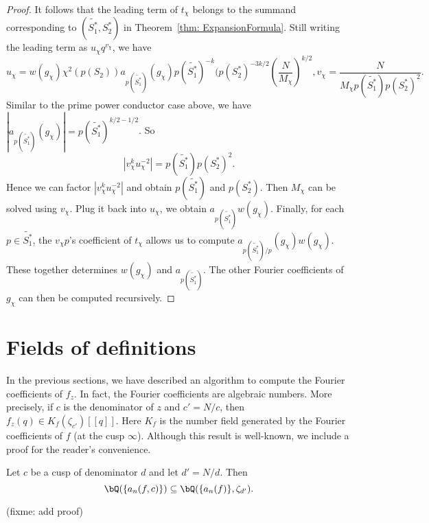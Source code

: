 \documentclass [11pt, proquest] {uwthesis}[2015/03/03]
\begin{document}
\begin{proof}
It follows that the leading term of $t_\chi$ belongs to the summand corresponding to $(\widetilde{S_1^*}, S_2^*)$ in  Theorem~\ref{thm: ExpansionFormula}. Still writing the leading term as $u_\chi q^{v_\chi}$, we have 
\[
	u_\chi = w(g_\chi) \chi^2(p(S_2)) a_{p(\widetilde{S_1^*})}(g_\chi) p(\widetilde{S_1^*})^{-k} (p(S_2^*)^{-3k/2} \left(\frac{N}{M_\chi}\right)^{k/2}, v_\chi = \frac{N}{M_\chi p(\widetilde{S_1^*}) p(S_2^*)^2}. 
\]
Similar to the prime power conductor case above, we have $|a_{p(\widetilde{S_1^*})}(g_\chi)|  = p(\widetilde{S_1^*})^{k/2 -1/2}$.  So 
\begin{equation} \label{formula: converse}
	|v_\chi^{k} u_\chi^{-2}| = p(\widetilde{S_1^*}) p(S_2^*)^2.
\end{equation}
Hence we can factor $|v_\chi^{k} u_\chi^{-2}|$ and obtain $p(\widetilde{S_1^*})$
and $p(S_2^*)$. Then $M_\chi$ can be solved using $v_\chi$. Plug it back into $u_\chi$, we obtain $a_{p(\widetilde{S_1^*})} w(g_\chi)$. Finally, for each $p \in \widetilde{S_1^*}$,  the $v_\chi p$'s coefficient of 
$t_\chi$ allows us to compute $a_{p(\widetilde{S_1^*})/p}(g_\chi) w(g_\chi)$. These together determines $w(g_\chi)$ and 
$a_{p(\widetilde{S_1^*})}$. The other Fourier coefficients of $g_\chi$ can then be computed recursively. 
\end{proof}




\section{Fields of definitions}

In the previous sections, we have described an algorithm to compute the Fourier coefficients of $f_z$. In fact, the Fourier coefficients are algebraic numbers. More precisely, if 
$c$ is the denominator of  $z$ and $c' = N/c$, then $f_z (q) \in K_f(\zeta_{c'})[[q]]$. Here $K_f$ is the number field generated by the Fourier coefficients of $f$ (at the cusp $\infty$). Although this result is well-known, we include a proof for the reader's convenience.
\begin{Lemma}
Let $c$ be a cusp of denominator $d$ and let $d' = N/d$. Then 
\[
	\bQ(\{a_n(f, c)\}) \subseteq \bQ( \{a_n(f)\}, \zeta_{d'}). 
\]
\end{Lemma}

(fixme: add proof)

\end{document}

